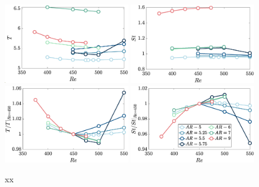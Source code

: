 \begin{figure}
  \centering
  \includegraphics[width=0.49\textwidth]{./fig/long/T_Re.eps}
  \includegraphics[width=0.49\textwidth]{./fig/long/St_Re.eps}
  \includegraphics[width=0.49\textwidth]{./fig/long/T_Re_b.eps}
  \includegraphics[width=0.49\textwidth]{./fig/long/St_Re_b.eps}
  \caption{xx}
  \label{fig:T_St_Re_long}
\end{figure}


